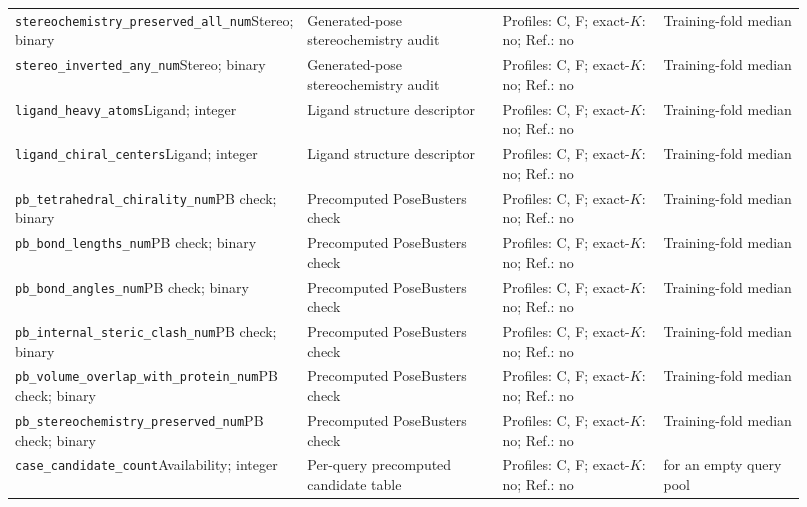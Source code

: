 \begin{longtable}{@{}>{\raggedright\arraybackslash}p{0.22\linewidth}>{\raggedright\arraybackslash}p{0.27\linewidth}>{\raggedright\arraybackslash}p{0.23\linewidth}>{\raggedright\arraybackslash}p{0.20\linewidth}@{}}
\texttt{stereochemistry_preserved_all_num}\newline Stereo; binary & Generated-pose stereochemistry audit & Profiles: C, F; exact-$K$: no; Ref.: no & Training-fold median\\
\texttt{stereo_inverted_any_num}\newline Stereo; binary & Generated-pose stereochemistry audit & Profiles: C, F; exact-$K$: no; Ref.: no & Training-fold median\\
\texttt{ligand_heavy_atoms}\newline Ligand; integer & Ligand structure descriptor & Profiles: C, F; exact-$K$: no; Ref.: no & Training-fold median\\
\texttt{ligand_chiral_centers}\newline Ligand; integer & Ligand structure descriptor & Profiles: C, F; exact-$K$: no; Ref.: no & Training-fold median\\
\texttt{pb_tetrahedral_chirality_num}\newline PB check; binary & Precomputed PoseBusters check & Profiles: C, F; exact-$K$: no; Ref.: no & Training-fold median\\
\texttt{pb_bond_lengths_num}\newline PB check; binary & Precomputed PoseBusters check & Profiles: C, F; exact-$K$: no; Ref.: no & Training-fold median\\
\texttt{pb_bond_angles_num}\newline PB check; binary & Precomputed PoseBusters check & Profiles: C, F; exact-$K$: no; Ref.: no & Training-fold median\\
\texttt{pb_internal_steric_clash_num}\newline PB check; binary & Precomputed PoseBusters check & Profiles: C, F; exact-$K$: no; Ref.: no & Training-fold median\\
\texttt{pb_volume_overlap_with_protein_num}\newline PB check; binary & Precomputed PoseBusters check & Profiles: C, F; exact-$K$: no; Ref.: no & Training-fold median\\
\texttt{pb_stereochemistry_preserved_num}\newline PB check; binary & Precomputed PoseBusters check & Profiles: C, F; exact-$K$: no; Ref.: no & Training-fold median\\
\texttt{case_candidate_count}\newline Availability; integer & Per-query precomputed candidate table & Profiles: C, F; exact-$K$: no; Ref.: no & 0 for an empty query pool\\

\end{longtable}
